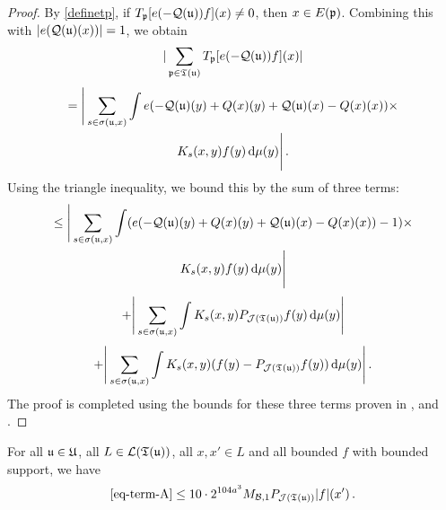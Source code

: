 \begin{proof}
    \leanok
    By \eqref{definetp}, if $T_{{\mathfrak p}}[ e(-{\mathcal{Q}}({\mathfrak u}))f](x) \ne 0$, then $x \in E({\mathfrak p})$. Combining this with $|e({\mathcal{Q}}({\mathfrak u})(x))| = 1$, we obtain
    $$
        |\sum_{{\mathfrak p} \in {\mathfrak T}({\mathfrak u})} T_{{\mathfrak p}}[ e(-{\mathcal{Q}}({\mathfrak u}))f](x)|
    $$
    \begin{multline*}
        = \Bigg| \sum_{s \in \sigma({\mathfrak u}, x)} \int e(-{\mathcal{Q}}({\mathfrak u})(y) + {Q}(x)(y) + {\mathcal{Q}}({\mathfrak u})(x) -{Q}(x)(x))\times\\
        K_s(x,y)f(y) \, \mathrm{d}\mu(y) \Bigg|\,.
    \end{multline*}
    Using the triangle inequality, we bound this by the sum of three terms:
    \begin{multline}
        \label{eq-term-A}
        \le \Bigg| \sum_{s \in \sigma({\mathfrak u}, x)} \int (e(-{\mathcal{Q}}({\mathfrak u})(y) + {Q}(x)(y) + {\mathcal{Q}}({\mathfrak u})(x) -{Q}(x)(x))-1)\times\\
        K_s(x,y)f(y) \, \mathrm{d}\mu(y) \Bigg|
    \end{multline}
    \begin{equation}
        \label{eq-term-B}
        + \Bigg| \sum_{s \in \sigma({\mathfrak u}, x)} \int K_s(x,y) P_{\mathcal{J}({\mathfrak T}({\mathfrak u}))} f(y) \, \mathrm{d}\mu(y) \Bigg|
    \end{equation}
    \begin{equation}
        \label{eq-term-C}
        + \Bigg| \sum_{s \in \sigma({\mathfrak u}, x)} \int K_s(x,y) (f(y) - P_{\mathcal{J}({\mathfrak T}({\mathfrak u}))} f(y)) \, \mathrm{d}\mu(y) \Bigg|\,.
    \end{equation}
    The proof is completed using the bounds for these three terms proven in ,  and .
\end{proof}

\begin{lemma}
    \label{first-tree-pointwise}
    \leanok
    For all ${\mathfrak u} \in {\mathfrak U}$, all $L \in \mathcal{L}({\mathfrak T}({\mathfrak u}))$, all $x, x' \in L$ and all bounded $f$ with bounded support, we have
    $$
        \eqref{eq-term-A} \le 10 \cdot 2^{104a^3} M_{\mathcal{B}, 1}P_{\mathcal{J}({\mathfrak T}({\mathfrak u}))}|f|(x')\,.
    $$
\end{lemma}


